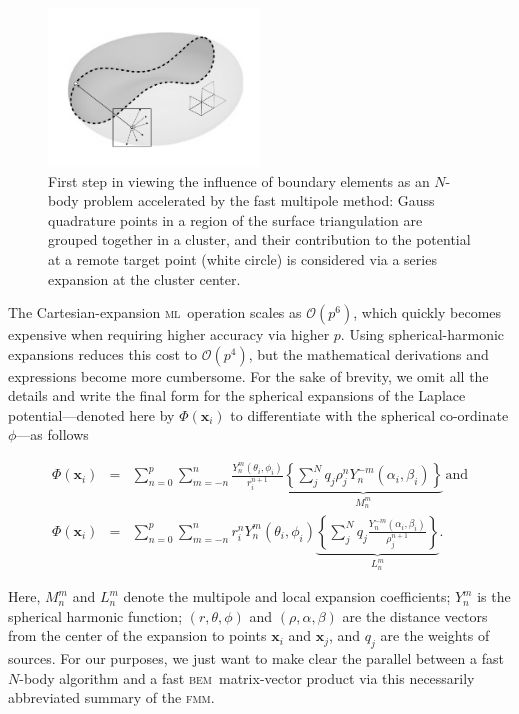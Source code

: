 \documentclass[final,3p,times]{elsarticle}
\newcommand{\bem}{\textsc{bem}\xspace}
\newcommand{\fmm}{\textsc{fmm}\xspace}
\renewcommand{\O}[1]{\mathcal{O}(#1)}
\newcommand{\mtol}{\textsc{m}\texttwooldstyle\textsc{l}\xspace} %
\newcommand{\vect}[1]{\mathbf{#1}}
\begin{document}
\begin{figure}
\begin{center}
	\includegraphics[width=0.5\textwidth]{redbloodcell-panel-fmm.pdf}
	\caption{First step in viewing the influence of boundary elements as an $N$-body problem accelerated by the fast multipole method: Gauss quadrature points in a region of the surface triangulation are grouped together in a cluster, and their contribution to the potential at a remote target point (white circle) is considered via a series expansion at the cluster center.}
	\label{fig:rbc_fmmbox}
\end{center}
\end{figure}

The Cartesian-expansion \mtol\ operation scales as $\O{p^{6}}$, which quickly becomes expensive when requiring higher accuracy via higher $p$. Using spherical-harmonic expansions reduces this cost to  $\O{p^{4}}$, but the mathematical derivations and expressions become more cumbersome. For the sake of brevity, we omit all the details and write the final form for the spherical expansions of the Laplace potential---denoted here by $\Phi(\vect{x}_i)$ to differentiate with the spherical co-ordinate $\phi$---as follows

\begin{eqnarray}
	\Phi(\vect{x}_i) & = & \sum_{n=0}^{p}\sum_{m=-n}^{n}\frac{Y^{m}_n(\theta_i,\phi_i)}{r_i^{n+1}}\underbrace{\left \{ \sum_j^{N}q_j\rho^{n}_jY^{-m}_n(\alpha_i,\beta_i)\right \} }_{M^{m}_n} \, \text{and}\\
	\Phi(\vect{x}_i) & = & \sum_{n=0}^{p}\sum_{m=-n}^{n}r_i^{n}Y^{m}_n(\theta_i,\phi_i)\underbrace{\left \{ \sum_j^{N}q_j\frac{Y^{-m}_n(\alpha_i,\beta_i)}{\rho^{n+1}_j}\right \} }_{L^{m}_n}.
\end{eqnarray}

\noindent
Here, $M^{m}_n$ and $L^{m}_n$ denote the multipole and local expansion coefficients; $Y_{n}^{m}$ is the spherical harmonic function; $(r,\theta,\phi)$ and $(\rho,\alpha,\beta)$ are the distance vectors from the center of the expansion to points $\vect{x}_i$ and $\vect{x}_j$, and $q_j$ are the weights of sources. For our purposes, we just want to make clear the parallel between a fast $N$-body algorithm and a fast \bem\ matrix-vector product via this necessarily abbreviated summary of the \fmm.
\end{document}
